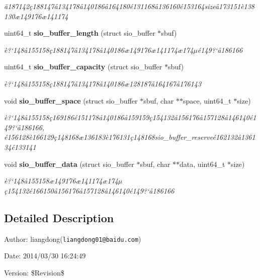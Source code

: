 \begin{CompactItemize}
\begin{CompactList}\small\item\em \"{a}187142\c{c}188147\aa{}134178\aa{}140186\aa{}164180\'{e}131168\aa{}136160\'{e}153164size\aa{}173151\`{e}138130\ae{}149176\ae{}141174 \item\end{CompactList}\item 
uint64\_\-t {\bf sio\_\-buffer\_\-length} (struct sio\_\-buffer $\ast$sbuf)
\begin{CompactList}\small\item\em \`{e}?`148\aa{}155158\c{c}188147\aa{}134178\aa{}140186\ae{}149176\ae{}141174\ae{}174$\mu$\'{e}149?`\aa{}186166 \item\end{CompactList}\item 
uint64\_\-t {\bf sio\_\-buffer\_\-capacity} (struct sio\_\-buffer $\ast$sbuf)
\begin{CompactList}\small\item\em \`{e}?`148\aa{}155158\c{c}188147\aa{}134178\aa{}140186\ae{}128187\aa{}164167\aa{}176143 \item\end{CompactList}\item 
void {\bf sio\_\-buffer\_\-space} (struct sio\_\-buffer $\ast$sbuf, char $\ast$$\ast$space, uint64\_\-t $\ast$size)
\begin{CompactList}\small\item\em \`{e}?`148\aa{}155158\c{c}169186\'{e}151178\aa{}140186\aa{}159159\c{c}154132\aa{}156176\aa{}157128\aa{}146140\'{e}149?`\aa{}186166, \'{e}156128\`{e}166129\c{c}148168\ae{}136183\`{e}176131\c{c}148168sio\_\-buffer\_\-reserve\'{e}162132\aa{}136134\'{e}133141 \item\end{CompactList}\item 
void {\bf sio\_\-buffer\_\-data} (struct sio\_\-buffer $\ast$sbuf, char $\ast$$\ast$data, uint64\_\-t $\ast$size)
\begin{CompactList}\small\item\em \`{e}?`148\aa{}155158\ae{}149176\ae{}141174\ae{}174$\mu$\c{c}154132\'{e}166150\aa{}156176\aa{}157128\aa{}146140\'{e}149?`\aa{}186166 \item\end{CompactList}\end{CompactItemize}


\subsection{Detailed Description}
\begin{Desc}
\item[Author:]liangdong({\tt liangdong01@baidu.com}) \end{Desc}
\begin{Desc}
\item[Date:]2014/03/30 16:24:49 \end{Desc}
\begin{Desc}
\item[Version:]\$Revision\$ \end{Desc}


